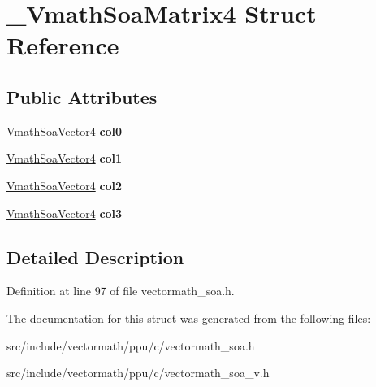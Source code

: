 \hypertarget{struct__VmathSoaMatrix4}{\section{\-\_\-\-Vmath\-Soa\-Matrix4 Struct Reference}
\label{struct__VmathSoaMatrix4}
}
\subsection*{Public Attributes}
\begin{DoxyCompactItemize}
\item 
\hypertarget{struct__VmathSoaMatrix4_ab5f077c52ce7d45792875bc95c8524bb}{\hyperlink{struct__VmathSoaVector4}{Vmath\-Soa\-Vector4} {\bfseries col0}}\label{struct__VmathSoaMatrix4_ab5f077c52ce7d45792875bc95c8524bb}

\item 
\hypertarget{struct__VmathSoaMatrix4_a8249dac895fb491c40bcf33dcf148013}{\hyperlink{struct__VmathSoaVector4}{Vmath\-Soa\-Vector4} {\bfseries col1}}\label{struct__VmathSoaMatrix4_a8249dac895fb491c40bcf33dcf148013}

\item 
\hypertarget{struct__VmathSoaMatrix4_a8b88a96b54598781ebc9db1ad6a02ea5}{\hyperlink{struct__VmathSoaVector4}{Vmath\-Soa\-Vector4} {\bfseries col2}}\label{struct__VmathSoaMatrix4_a8b88a96b54598781ebc9db1ad6a02ea5}

\item 
\hypertarget{struct__VmathSoaMatrix4_a971f1b8a86dd7a048f51c06a2f6372e6}{\hyperlink{struct__VmathSoaVector4}{Vmath\-Soa\-Vector4} {\bfseries col3}}\label{struct__VmathSoaMatrix4_a971f1b8a86dd7a048f51c06a2f6372e6}

\end{DoxyCompactItemize}


\subsection{Detailed Description}


Definition at line 97 of file vectormath\-\_\-soa.\-h.



The documentation for this struct was generated from the following files\-:\begin{DoxyCompactItemize}
\item 
src/include/vectormath/ppu/c/vectormath\-\_\-soa.\-h\item 
src/include/vectormath/ppu/c/vectormath\-\_\-soa\-\_\-v.\-h\end{DoxyCompactItemize}
